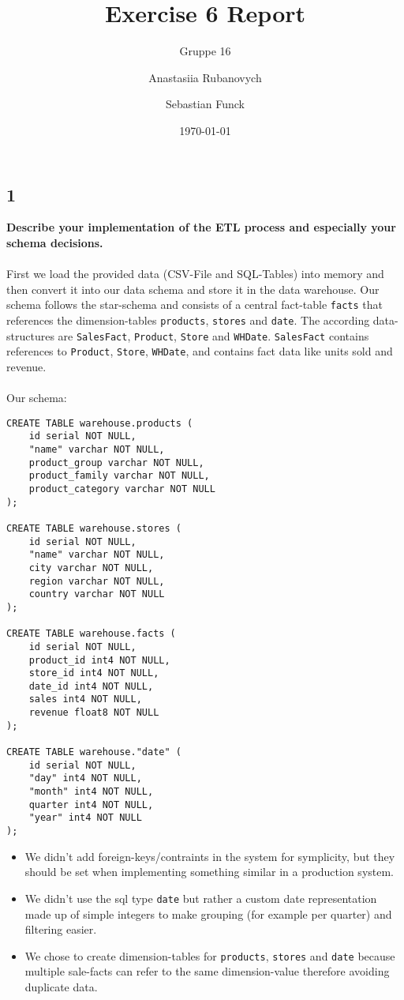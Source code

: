 \documentclass[a4paper,english,abstract=on]{scrartcl}
\title{Exercise 6 Report}
\subtitle{Gruppe 16}
\author{Anastasiia Rubanovych\and Sebastian Funck}
\date{\today}
\begin{document}
\maketitle

\subsection*{1}
\textbf{Describe your implementation of the ETL process and especially your schema decisions.}
~\\~\\
First we load the provided data (CSV-File and SQL-Tables) into memory and then convert it into our data schema and store it in the data warehouse. Our schema follows the star-schema and consists of a central fact-table \texttt{facts} that references the dimension-tables \texttt{products}, \texttt{stores} and \texttt{date}. The according data-structures are \texttt{SalesFact}, \texttt{Product}, \texttt{Store} and \texttt{WHDate}. \texttt{SalesFact} contains references to \texttt{Product}, \texttt{Store}, \texttt{WHDate}, and contains fact data like units sold and revenue.
~\\~\\
Our schema:
\begin{lstlisting}
CREATE TABLE warehouse.products (
	id serial NOT NULL,
	"name" varchar NOT NULL,
	product_group varchar NOT NULL,
	product_family varchar NOT NULL,
	product_category varchar NOT NULL
);

CREATE TABLE warehouse.stores (
	id serial NOT NULL,
	"name" varchar NOT NULL,
	city varchar NOT NULL,
	region varchar NOT NULL,
	country varchar NOT NULL
);

CREATE TABLE warehouse.facts (
	id serial NOT NULL,
	product_id int4 NOT NULL,
	store_id int4 NOT NULL,
	date_id int4 NOT NULL,
	sales int4 NOT NULL,
	revenue float8 NOT NULL
);

CREATE TABLE warehouse."date" (
	id serial NOT NULL,
	"day" int4 NOT NULL,
	"month" int4 NOT NULL,
	quarter int4 NOT NULL,
	"year" int4 NOT NULL
);
\end{lstlisting}
\begin{itemize}
	\item We didn't add foreign-keys/contraints in the system for symplicity, but they should be set when implementing something similar in a production system.
	\item We didn't use the sql type \texttt{date} but rather a custom date representation made up of simple integers to make grouping (for example per quarter) and filtering easier.
		\item We chose to create dimension-tables for \texttt{products}, \texttt{stores} and \texttt{date} because multiple sale-facts can refer to the same dimension-value therefore avoiding duplicate data.
\end{itemize}
\end{document}

